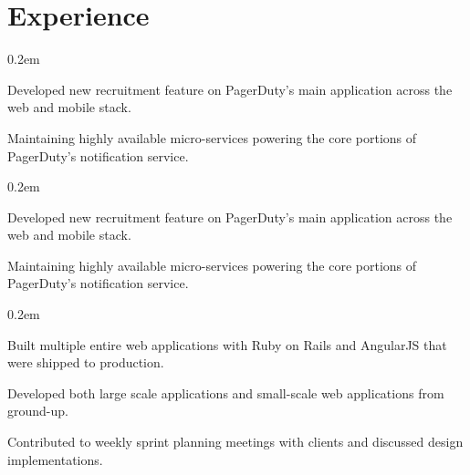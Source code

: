 \documentclass[]{deedy-resume}
\begin{document}
\begin{minipage}[t]{0.74\textwidth}


\section{Experience}

\vspace{\topsep}
\begin{tightemize}\itemsep0.2em
\item Developed new recruitment feature on PagerDuty's main application across the web and mobile stack.
\item Maintaining highly available micro-services powering the core portions of PagerDuty's notification service.
\end{tightemize}


\begin{tightemize}\itemsep0.2em
\item Developed new recruitment feature on PagerDuty's main application across the web and mobile stack.
\item Maintaining highly available micro-services powering the core portions of PagerDuty's notification service.
\end{tightemize}

\begin{tightemize}\itemsep0.2em
\item Built multiple entire web applications with Ruby on Rails and AngularJS that were shipped to production.
\item Developed both large scale applications and small-scale web applications from ground-up.
\item Contributed to weekly sprint planning meetings with clients and discussed design implementations.
\end{tightemize}


\end{minipage}
\end{document}
